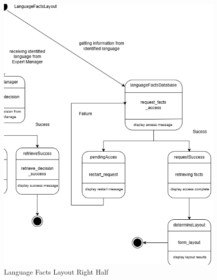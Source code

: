 \begin{figure}[H]
	\centering
	\includegraphics[width=\textwidth, height=0.95\textheight, keepaspectratio]{Section2/images/Language_Facts_Layout_state_diagramV3Right.png}
	\caption{Language Facts Layout Right Half}
	\label{FormController}
\end{figure}